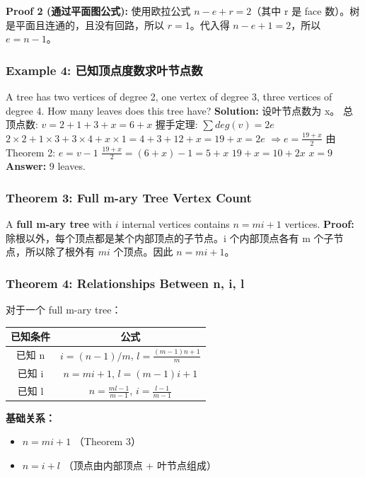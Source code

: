 \documentclass[10pt,a4paper,openany]{ctexbook}
\theoremstyle{definition}
\theoremstyle{remark}
\begin{document}
\textbf{Proof 2 (通过平面图公式):} 使用欧拉公式 $n - e + r = 2$（其中 r 是 face 数）。树是平面且连通的，且没有回路，所以 $r = 1$。代入得 $n - e + 1 = 2$，所以 $e = n - 1$。
\vspace{-2pt}

\subsubsection{Example 4: 已知顶点度数求叶节点数}

A tree has two vertices of degree 2, one vertex of degree 3, three vertices of degree 4. How many leaves does this tree have?
\textbf{Solution:}
设叶节点数为 x。
总顶点数: $v = 2 + 1 + 3 + x = 6 + x$
握手定理: $\sum deg(v) = 2e$
$2 \times 2 + 1 \times 3 + 3 \times 4 + x \times 1 = 4 + 3 + 12 + x = 19 + x = 2e$
$\Rightarrow e = \frac{19+x}{2}$
由 Theorem 2: $e = v - 1$
$\frac{19+x}{2} = (6+x) - 1 = 5 + x$
$19 + x = 10 + 2x$
$x = 9$
\textbf{Answer:} 9 leaves.
\vspace{-2pt}

\subsubsection{Theorem 3: Full m-ary Tree Vertex Count}

A \textbf{full m-ary tree} with $i$ internal vertices contains $n = mi + 1$ vertices.
\textbf{Proof:} 除根以外，每个顶点都是某个内部顶点的子节点。i 个内部顶点各有 m 个子节点，所以除了根外有 $mi$ 个顶点。因此 $n = mi + 1$。
\vspace{-2pt}

\subsubsection{Theorem 4: Relationships Between n, i, l}

对于一个 full m-ary tree：
\begin{center}
\begin{tabular}{cc}
\hline
已知条件 & 公式 \\ \hline
已知 n & $i = (n-1)/m$, $l = \frac{(m-1)n + 1}{m}$ \\
已知 i & $n = mi + 1$, $l = (m-1)i + 1$ \\
已知 l & $n = \frac{ml - 1}{m-1}$, $i = \frac{l-1}{m-1}$ \\
\hline
\end{tabular}

\end{center}

\textbf{基础关系：}
\begin{itemize}
\item $n = mi + 1$ （Theorem 3）
\item $n = i + l$ （顶点由内部顶点 + 叶节点组成）

\end{itemize}
\end{document}
